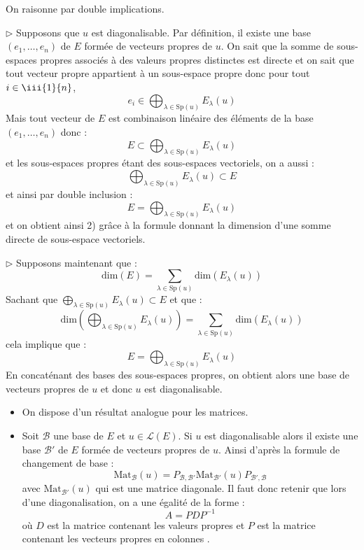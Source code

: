 \documentclass[french,11pt,twoside]{VcCours}
\begin{document}
\begin{Demonstration}{} On raisonne par double implications.

%
$\rhd$ Supposons que $u$ est diagonalisable. Par définition, il existe une base $(e_1, \ldots, e_n)$ de $E$ formée de vecteurs propres de $u$. On sait que la somme de sous-espaces propres associés à des valeurs propres distinctes est directe et on sait que tout vecteur propre appartient à un sous-espace propre donc pour tout $i \in \iii{1}{n}$,
$$ e_i \in \bigoplus_{\lambda \in \textrm{Sp}(u)} E_{\lambda}(u)$$
Mais tout vecteur de $E$ est combinaison linéaire des éléments de la base $(e_1, \ldots, e_n)$ donc :
$$E \subset \bigoplus_{\lambda \in \textrm{Sp}(u)} E_{\lambda}(u)$$
et les sous-espaces propres étant des sous-espaces vectoriels, on a aussi :
$$  \bigoplus_{\lambda \in \textrm{Sp}(u)} E_{\lambda}(u) \subset E $$
et ainsi par double inclusion :
$$ E= \bigoplus_{\lambda \in \textrm{Sp}(u)} E_{\lambda}(u)$$
et on obtient ainsi 2) grâce à la formule donnant la dimension d'une somme directe de sous-espace vectoriels.

%
$\rhd$ Supposons maintenant que :
$$\textrm{dim}(E) = \sum_{\lambda \in \textrm{Sp}(u)} \textrm{dim}(E_{\lambda}(u)) $$
Sachant que $\bigoplus_{\lambda \in \textrm{Sp}(u)} E_{\lambda}(u) \subset E$ et que :
$$ \textrm{dim} \left(\bigoplus_{\lambda \in \textrm{Sp}(u)} E_{\lambda}(u) \right) =  \sum_{\lambda \in \textrm{Sp}(u)} \textrm{dim}(E_{\lambda}(u))$$
cela implique que :
$$ E = \bigoplus_{\lambda \in \textrm{Sp}(u)} E_{\lambda}(u)$$
En concaténant des bases des sous-espaces propres, on obtient alors une base de vecteurs propres de $u$ et donc $u$ est diagonalisable.
\end{Demonstration}

\begin{Remarques}{}
\begin{itemize} 
\item On dispose d'un résultat analogue pour les matrices. 
\item Soit $\mathcal{B}$ une base de $E$ et $u \in \mathcal{L}(E)$. Si $u$ est diagonalisable alors il existe une base $\mathcal{B'}$ de $E$ formée de vecteurs propres de $u$. Ainsi d'après la formule de changement de base :
$$ \textrm{Mat}_{\mathcal{B}}(u) = P_{\mathcal{B}, \mathcal{B}'}  \textrm{Mat}_{\mathcal{B}'}(u) P_{\mathcal{B}', \mathcal{B}}$$
avec $\textrm{Mat}_{\mathcal{B}'}(u)$ qui est une matrice diagonale. Il faut donc retenir que lors d'une diagonalisation, on a une égalité de la forme :
$$ A = P D P^{-1}$$
où $D$ est la matrice contenant les valeurs propres et $P$ est la matrice contenant les vecteurs propres \og en colonnes \fg.
\end{itemize}
\end{Remarques}
\end{document}
